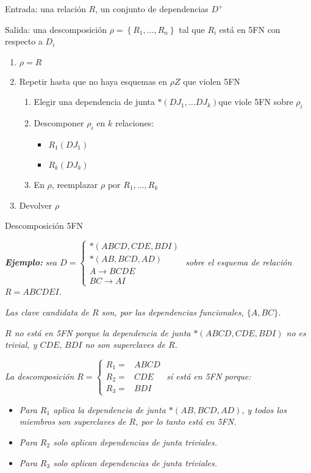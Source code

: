 \documentclass[a4paper, twoside]{article}
\begin{document}
\begin{algorithm}[H]
	Entrada: una relación $R$, un conjunto de dependencias $D^{+}$

	Salida: una descomposición $\rho=\left\{ R_{1},\ldots,R_{n}\right\} $ tal que $R_{i}$ está en 5FN con respecto a $D_{i}$
	\begin{enumerate}
		\item $\rho=R$
		\item Repetir hasta que no haya esquemas en $\rho Z$ que violen 5FN
		\begin{enumerate}
			\item Elegir una dependencia de junta $*\left(DJ_{1},\ldots DJ_{k}\right)$que viole 5FN sobre $\rho_{i}$
			\item Descomponer $\rho_{i}$ en $k$ relaciones:
			\begin{itemize}
				\item $R_{1}\left(DJ_{1}\right)$
				\item $R_{k}\left(DJ_{k}\right)$
			\end{itemize}
			\item En $\rho$, reemplazar $\rho$ por $R_{1},\ldots,R_{k}$
		\end{enumerate}
		\item Devolver $\rho$
	\end{enumerate}
	\caption{Descomposición 5FN}
\end{algorithm}

\textbf{\emph{Ejemplo:}} \emph{sea $D = 
\begin{cases}
	*\left(ABCD,CDE,BDI\right)\\
	*\left(AB,BCD,AD\right)\\
	A\to BCDE\\
	BC\to AI
\end{cases}$ sobre el esquema de relación $R=ABCDEI$.}

\emph{Las clave candidata de $R$ son, por las dependencias funcionales, $\{A,BC\}$.}

\emph{$R$ no está en 5FN porque la dependencia de junta $*\left(ABCD,CDE,BDI\right)$ no es trivial, y $CDE,\, BDI$ no son superclaves de $R$.}

\emph{La descomposición $R = 
\begin{cases}
	R_{1}= & ABCD\\
	R_{2}= & CDE\\
	R_{3}= & BDI
\end{cases}$ sí está en 5FN porque:}
\begin{itemize}
	\item \emph{Para $R_{1}$ aplica la dependencia de junta $*\left(AB,BCD,AD\right)$, y todos los miembros son superclaves de $R$, por lo tanto está en 5FN.}
	\item \emph{Para $R_{2}$ solo aplican dependencias de junta triviales.}
	\item \emph{Para $R_{3}$ solo aplican dependencias de junta triviales.}
\end{itemize}
\end{document}
